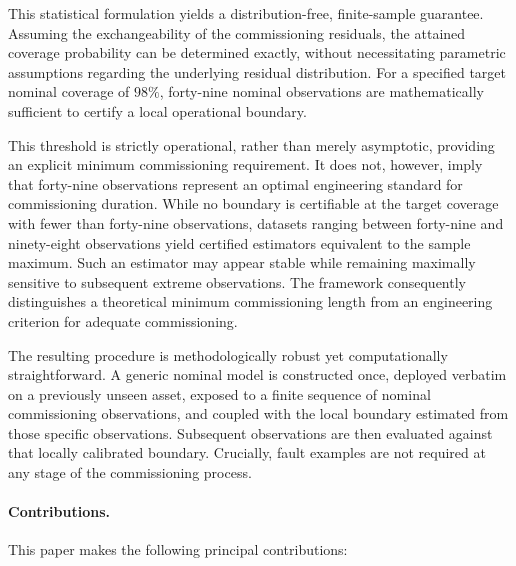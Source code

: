 \documentclass[a4paper]{cas-sc}
\begin{document}
This statistical formulation yields a distribution-free, finite-sample guarantee. Assuming the exchangeability of the commissioning residuals, the attained coverage probability can be determined exactly, without necessitating parametric assumptions regarding the underlying residual distribution. For a specified target nominal coverage of \(98\%\), forty-nine nominal observations are mathematically sufficient to certify a local operational boundary.

This threshold is strictly operational, rather than merely asymptotic, providing an explicit minimum commissioning requirement. It does not, however, imply that forty-nine observations represent an optimal engineering standard for commissioning duration. While no boundary is certifiable at the target coverage with fewer than forty-nine observations, datasets ranging between forty-nine and ninety-eight observations yield certified estimators equivalent to the sample maximum. Such an estimator may appear stable while remaining maximally sensitive to subsequent extreme observations. The framework consequently distinguishes a theoretical minimum commissioning length from an engineering criterion for adequate commissioning.

The resulting procedure is methodologically robust yet computationally straightforward. A generic nominal model is constructed once, deployed verbatim on a previously unseen asset, exposed to a finite sequence of nominal commissioning observations, and coupled with the local boundary estimated from those specific observations. Subsequent observations are then evaluated against that locally calibrated boundary. Crucially, fault examples are not required at any stage of the commissioning process.

\paragraph{Contributions.}
This paper makes the following principal contributions:
\end{document}
